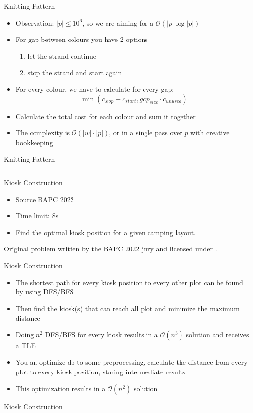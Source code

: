 \documentclass[11pt,pdf, aspectratio=169]{beamer}
\begin{document}
  \begin{frame}{Knitting Pattern}
    \begin{itemize}
      \item<+-> Observation: $|p| \leq 10^6$, so we are aiming for a $\mathcal{O}(|p|\log{}|p|)$
      \item<+-> For gap between colours you have 2 options
      \begin{enumerate}
        \item<+-> let the strand continue
        \item<+-> stop the strand and start again
      \end{enumerate}
      \item<+-> For every colour, we have to calculate for every gap: \[\min(c_{stop}+c_{start}, gap_{size}\cdot c_{unused})\]
      \item<+-> Calculate the total cost for each colour and sum it together
      \item<+-> The complexity is $\mathcal{O}(|w|\cdot |p|)$, or in a single pass over $p$ with creative bookkeeping
    \end{itemize}
  \end{frame}
  \begin{frame}[containsverbatim]{Knitting Pattern}
    \inputminted{python}{code/session-1/python/dapc-k.py}
  \end{frame}

  \begin{frame}{Kiosk Construction}
    \begin{itemize}
      \item Source BAPC 2022
      \item Time limit: 8s
      \item Find the optimal kiosk position for a given camping layout.
    \end{itemize}
    Original problem written by the BAPC 2022 jury and licensed under \doclicenseLongNameRef.

    \doclicenseImage
  \end{frame}
  \begin{frame}{Kiosk Construction}
    \begin{itemize}
      \item<+-> The shortest path for every kiosk position to every other plot can be found by using DFS/BFS
      \item<+-> Then find the kiosk(s) that can reach all plot and minimize the maximum distance
      \item<+-> Doing $n^2$ DFS/BFS for every kiosk results in a $\mathcal{O}(n^3)$ solution and receives a TLE
      \item<+-> You an optimize do to some preprocessing, calculate the distance from every plot to every kiosk position, storing intermediate results
      \item<+-> This optimization results in a $\mathcal{O}(n^2)$ solution
    \end{itemize}
  \end{frame}
  \begin{frame}[containsverbatim]{Kiosk Construction}
    \inputminted[fontsize=\tiny]{python}{code/session-1/python/bapc-k.py}
  \end{frame}
\end{document}

